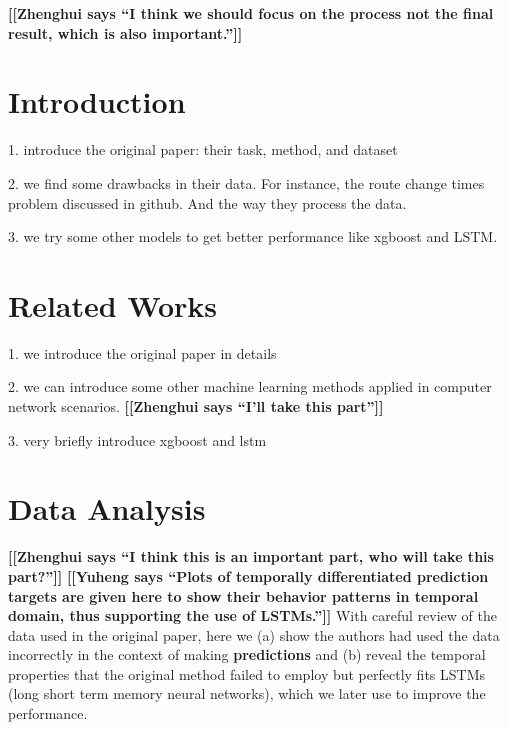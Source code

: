 \documentclass[sigconf]{acmart}
\newcommand{\heng}[1]{{\bf \color{cyan} [[Yuheng says ``#1'']]}}
\newcommand{\hui}[1]{{\bf \color{purple} [[Zhenghui says ``#1'']]}}
\begin{document}




\maketitle
\hui{I think we should focus on the process not the final result, which is also important.}
\section{Introduction}

1. introduce the original paper: their task, method, and dataset

2. we find some drawbacks in their data. For instance, the route change times problem discussed in github. And the way they process the data.

3. we try some other models to get better performance like xgboost and LSTM.

\section{Related Works}
1. we introduce the original paper in details

2. we can introduce some other machine learning methods applied in computer network scenarios. \hui{I'll take this part}

3. very briefly introduce xgboost and lstm

\section{Data Analysis}
\hui{I think this is an important part, who will take this part?}
\heng{Plots of temporally differentiated prediction targets are given here to show their behavior patterns in temporal domain, thus supporting the use of LSTMs.}
With careful review of the data used in the original paper, here we (a) show the authors had used the data incorrectly in the context of making \textbf{predictions} and (b) reveal the temporal properties that the original method failed to employ but perfectly fits LSTMs (long short term memory neural networks), which we later use to improve the performance.
\end{document}
